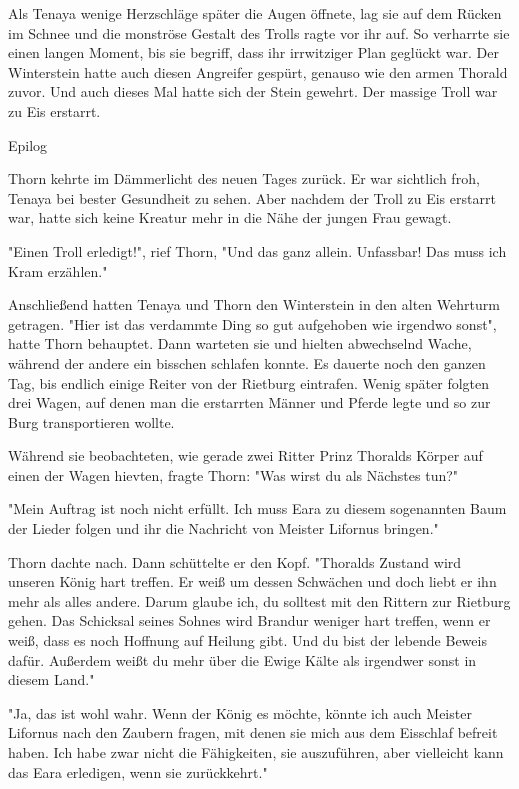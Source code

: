 \documentclass[10pt, a4paper, oneside]{book}
\begin{document}
\begin{multicols}{2}
Als Tenaya wenige Herzschläge später die Augen öffnete, lag sie auf dem Rücken im Schnee und die monströse Gestalt des Trolls ragte vor ihr auf. So verharrte sie einen langen Moment, bis sie begriff, dass ihr irrwitziger Plan geglückt war. Der Winterstein hatte auch diesen Angreifer gespürt, genauso wie den armen Thorald zuvor. Und auch dieses Mal hatte sich der Stein gewehrt. Der massige Troll war zu Eis erstarrt.\bigskip

Epilog

Thorn kehrte im Dämmerlicht des neuen Tages zurück. Er war sichtlich froh, Tenaya bei bester Gesundheit zu sehen. Aber nachdem der Troll zu Eis erstarrt war, hatte sich keine Kreatur mehr in die Nähe der jungen Frau gewagt. 

"Einen Troll erledigt!", rief Thorn, "Und das ganz allein. Unfassbar! Das muss ich Kram erzählen."

Anschließend hatten Tenaya und Thorn den Winterstein in den alten Wehrturm getragen. "Hier ist das verdammte Ding so gut aufgehoben wie irgendwo sonst", hatte Thorn behauptet. Dann warteten sie und hielten abwechselnd Wache, während der andere ein bisschen schlafen konnte. Es dauerte noch den ganzen Tag, bis endlich einige Reiter von der Rietburg eintrafen. Wenig später folgten drei Wagen, auf denen man die erstarrten Männer und Pferde legte und so zur Burg transportieren wollte. 

Während sie beobachteten, wie gerade zwei Ritter Prinz Thoralds Körper auf einen der Wagen hievten, fragte Thorn: "Was wirst du als Nächstes tun?"

"Mein Auftrag ist noch nicht erfüllt. Ich muss Eara zu diesem sogenannten Baum der Lieder folgen und ihr die Nachricht von Meister Lifornus bringen."

Thorn dachte nach. Dann schüttelte er den Kopf. "Thoralds Zustand wird unseren König hart treffen. Er weiß um dessen Schwächen und doch liebt er ihn mehr als alles andere. Darum glaube ich, du solltest mit den Rittern zur Rietburg gehen. Das Schicksal seines Sohnes wird Brandur weniger hart treffen, wenn er weiß, dass es noch Hoffnung auf Heilung gibt. Und du bist der lebende Beweis dafür. Außerdem weißt du mehr über die Ewige Kälte als irgendwer sonst in diesem Land."

"Ja, das ist wohl wahr. Wenn der König es möchte, könnte ich auch Meister Lifornus nach den Zaubern fragen, mit denen sie mich aus dem Eisschlaf befreit haben. Ich habe zwar nicht die Fähigkeiten, sie auszuführen, aber vielleicht kann das Eara erledigen, wenn sie zurückkehrt."


\end{multicols}
\end{document}
